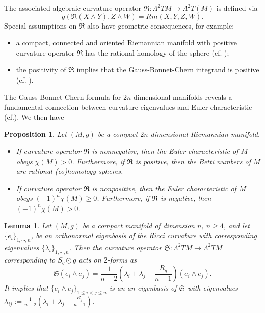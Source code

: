 \documentclass[12pt, twoside]{article}
\newtheorem{lemma}[theorem]{Lemma}
\newtheorem{proposition}[theorem]{Proposition}
\theoremstyle{definition}
\numberwithin{equation}{section}
\def \la {\lambda}
\def \La {\Lambda}
\begin{document}
The associated algebraic curvature operator $\mathfrak{R}:\La^{2}TM\rightarrow\La^{2}T(M)$ is defined via
$$g(\mathfrak{R}(X\wedge Y),Z\wedge W)=Rm(X,Y,Z,W).$$
Special assumptions on $\mathfrak{R}$ also have geometric consequences, for example:
\begin{itemize}
\item[(i)] a compact, connected and oriented Riemannian manifold with positive curvature operator $\mathfrak{R}$ has the rational homology of the sphere (cf. \cite{Mey71});
\item[(ii)] the positivity of $\mathfrak{R}$ implies that the Gauss-Bonnet-Chern integrand is positive (cf. \cite{Kul72}).
\end{itemize}
The Gauss-Bonnet-Chern formula for $2n$-dimensional manifolds reveals a fundamental connection between curvature eigenvalues and Euler characteristic (cf.\cite{BK78,Kul72}). We then have
\begin{proposition}\label{P2}
	Let $(M,g)$ be a compact $2n$-dimensional Riemannian manifold. 
	\begin{itemize}
		\item[(i)]
		If curvature operator $\mathfrak{R}$ is nonnegative, then the Euler characteristic of $M$ obeys $\chi(M)>0$. Furthermore, if  $\mathfrak{R}$ is positive, then the Betti numbers of $M$ are rational (co)homology spheres.
		\item[(ii)] If  curvature operator $\mathfrak{R}$ is nonpositive, then the Euler characteristic of $M$ obeys $(-1)^{n}\chi(M)\geq0$. Furthermore, if  $\mathfrak{R}$ is negative, then $(-1)^{n}\chi(M)>0$. 
	\end{itemize}
\end{proposition}
	\begin{lemma}\label{P5}
		Let $(M,g)$ be a compact manifold of dimension $n$, $n\geq4$, and let $\{e_{i}\}_{1,\cdots,n}$, be an orthonormal eigenbasis of the Ricci curvature with corresponding eigenvalues $\{\la_{i} \}_{1,\cdots,n}$. Then the curvature operator $\mathfrak{S}:\La^{2}TM\rightarrow\La^{2}TM$ corresponding to $S_{g}\odot g$ acts on $2$-forms as
		\begin{equation*}
		\mathfrak{S}(e_{i}\wedge e_{j})=\frac{1}{n-2}\left(\la_{i}+\la_{j}-\frac{R_{g}}{n-1}\right)(e_{i}\wedge e_{j}).
		\end{equation*}
		It implies that $\{e_{i}\wedge e_{j}\}_{1\leq i<j\leq n}$ is an  an eigenbasis of $\mathfrak{S}$ with eigenvalues
		$\la_{ij}:=\frac{1}{n-2}(\la_{i}+\la_{j}-\frac{R_{g}}{n-1})$.
	\end{lemma}
\end{document}
